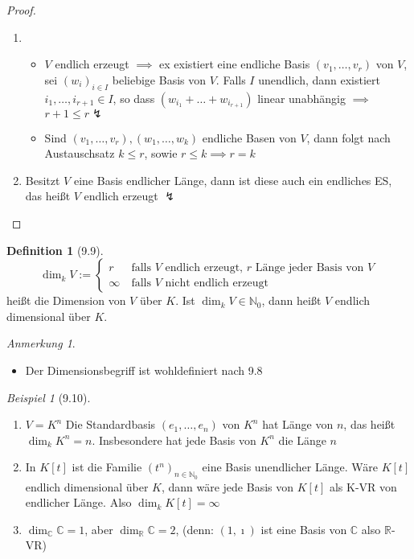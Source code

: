 \documentclass[a4paper]{scrartcl}
\theoremstyle{definition}
\newtheorem{defn}{Definition}
\theoremstyle{plain}
\theoremstyle{plain}
\theoremstyle{remark}
\theoremstyle{remark}
\newtheorem{note}{Anmerkung}
\theoremstyle{remark}
\theoremstyle{remark}
\theoremstyle{remark}
\newtheorem{ex}{Beispiel}
\newcommand{\I}{\ensuremath{\imath}}%
\begin{document}
\begin{proof}
\begin{enumerate}
\item \begin{itemize}
\item $V$ endlich erzeugt $\implies$ ex existiert eine endliche Basis $(v_1, \ldots, v_r)$ von $V$, sei $(w_i)_{i\in I}$ beliebige Basis von $V$. Falls $I$ unendlich, dann existiert $i_1, \ldots, i_{r + 1} \in I$, so dass $(w_{i_1} + \ldots + w_{i_{r + 1}})$
                linear unabhängig $\implies$ $r + 1 \leq r \lightning$
\item Sind $(v_1, \ldots, v_r), (w_1, \ldots, w_k)$ endliche Basen von $V$, dann folgt nach Austauschsatz $k \leq r$, sowie $r\leq k \implies r = k$
\end{itemize}
\item Besitzt $V$ eine Basis endlicher Länge, dann ist diese auch ein endliches ES, das heißt $V$ endlich erzeugt $\lightning$
\end{enumerate}
\end{proof}
\begin{defn}[9.9]
\[\dim_k V := \begin{cases} r & ~\text{falls $V$ endlich erzeugt, $r$ Länge jeder Basis von $V$} \\ \infty & ~\text{falls $V$ nicht endlich erzeugt}\end{cases}\]
heißt die Dimension von $V$ über $K$. Ist $\dim_k V\in\mathbb{N}_0$, dann heißt $V$ endlich dimensional über $K$.
\end{defn}
\begin{note}
\begin{itemize}
\item Der Dimensionsbegriff ist wohldefiniert nach 9.8
\end{itemize}
\end{note}
\begin{ex}[9.10]
\begin{enumerate}
\item $V = K^n$ Die Standardbasis $(e_1, \ldots, e_n)$ von $K^n$ hat Länge von $n$, das heißt $\dim_k K^n = n$. Insbesondere hat jede Basis von $K^n$ die Länge $n$
\item In $K[t]$ ist die Familie $(t^n)_{n\in\mathbb{N}_0}$ eine Basis unendlicher Länge. Wäre $K[t]$ endlich dimensional über $K$, dann wäre jede Basis von $K[t]$ als K-VR von endlicher Länge. Also $\dim_k K[t] = \infty$
\item $\dim_\mathbb{C} \mathbb{C} = 1$, aber $\dim_\mathbb{R} \mathbb{C} = 2$, (denn: $(1,\I)$ ist eine Basis von $\mathbb{C}$ also $\mathbb{R}$-VR)
\end{enumerate}
\end{ex}
\end{document}
